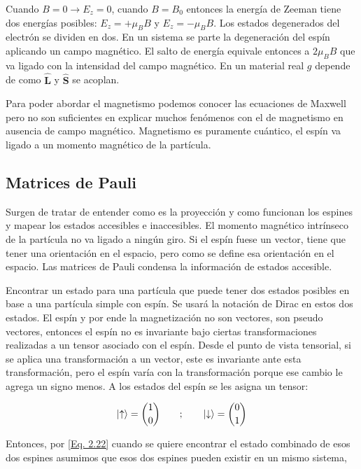 \documentclass[11pt,fleqn]{book}
\renewcommand{\vec}[1]{\mathbf{#1}}
\begin{document}
Cuando $B=0\longrightarrow E_{z}=0$, cuando $B=B_{0}$ entonces la energía de Zeeman tiene dos energías posibles: $E_{z}=+\mu_{B}B$ y $E_{z}=-\mu_{B}B$. Los estados degenerados del electrón se dividen en dos. En un sistema se parte la degeneración del espín aplicando un campo magnético. El salto de energía equivale entonces a $2\mu_{B}B$ que va ligado con la intensidad del campo magnético. En un material real $g$ depende de como $\hat{\vec{L}}$ y $\hat{\vec{S}}$ se acoplan.

Para poder abordar el magnetismo podemos conocer las ecuaciones de Maxwell pero no son suficientes en explicar muchos fenómenos con el de magnetismo en ausencia de campo magnético. Magnetismo es puramente cuántico, el espín va ligado a un momento magnético de la partícula.

\subsection{Matrices de Pauli}

Surgen de tratar de entender como es la proyección y como funcionan los espines y mapear los estados accesibles e inaccesibles. El momento magnético intrínseco de la partícula no va ligado a ningún giro. Si el espín fuese un vector, tiene que tener una orientación en el espacio, pero como se define esa orientación en el espacio. Las matrices de Pauli condensa la información de estados accesible.

Encontrar un  estado para una partícula que puede tener dos estados posibles en base a una partícula simple con espín. Se usará la notación de Dirac en estos dos estados. El espín y por ende la magnetización no son vectores, son pseudo vectores, entonces el espín no es invariante bajo ciertas transformaciones realizadas a un tensor asociado con el espín. Desde el punto de vista tensorial, si se aplica una transformación a un vector, este es invariante ante esta transformación, pero el espín varía con la transformación porque ese cambio le agrega un signo menos. A los estados del espín se les asigna un tensor:

\begin{equation}
    \ket{\uparrow}=\binom{1}{0} \qquad;\qquad \ket{\downarrow}=\binom{0}{1}
    \label{Eq. 2.22}
\end{equation}

Entonces, por \ref{Eq. 2.22} cuando se quiere encontrar el estado combinado de esos dos espines asumimos que esos dos espines pueden existir en un mismo sistema,
\end{document}
